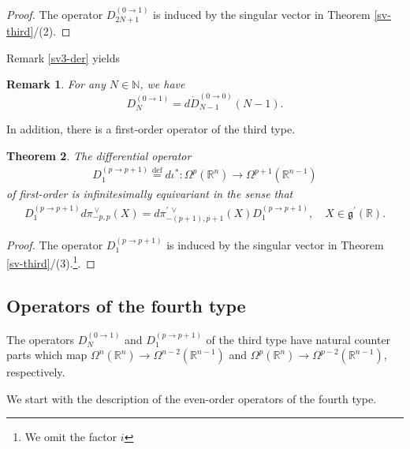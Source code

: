 \documentclass[a4paper,12pt,reqno]{amsart}
\newtheorem{theorem}{Theorem}
\newtheorem{bem}[theorem]{Remark}
\numberwithin{theorem}{subsection}
\numberwithin{equation}{section}
\begin{document}
\begin{proof} The operator $D_{2N+1}^{(0\to 1)}$ is induced by the singular vector in Theorem
\ref{sv-third}/(2).
\end{proof}

Remark \ref{sv3-der} yields

\begin{bem} For any $N \in {\mathbb{N}}$, we have
$$
   D_N^{(0 \to 1)} = d \dot{D}_{N-1}^{(0 \to 0)}(N\!-\!1).
$$
\end{bem}

In addition, there is a first-order operator of the third type.

\begin{theorem}\label{DO3-FO} The differential operator
\begin{align*}
   D_1^{(p \to p+1)} {\stackrel{\text{def}}{=}} {d} \iota^*: \Omega^p({\mathbb{R}}^n) \to \Omega^{p+1}({\mathbb{R}}^{n-1})
\end{align*}
of first-order is infinitesimally equivariant in the sense that
\begin{align*}
   D_1^{(p\to p+1)}{d}\pi^{{\,\vee}}_{-p,p}(X)
   = {d}\pi^{\prime{{\,\vee}}}_{-(p+1),p+1}(X) D^{(p\to p+1)}_{1},\quad X\in{{\mathfrak g}}^\prime({\mathbb{R}}).
\end{align*}
\end{theorem}

\begin{proof} The operator $D_{1}^{(p\to p+1)}$ is induced by the singular vector in Theorem
\ref{sv-third}/(3).\footnote{We omit the factor $i$}.
\end{proof}

\subsection{Operators of the fourth type}\label{CSBO-type4}

The operators $D_{N}^{(0\to  1)}$ and $D_{1}^{(p\to p+1)}$ of the third type
have natural counter parts which map $\Omega^n({\mathbb{R}}^n)\to \Omega^{n-2}({\mathbb{R}}^{n-1})$
and $\Omega^p({\mathbb{R}}^n)\to \Omega^{p-2}({\mathbb{R}}^{n-1})$, respectively.

We start with the description of the even-order operators of the fourth type.
\end{document}
